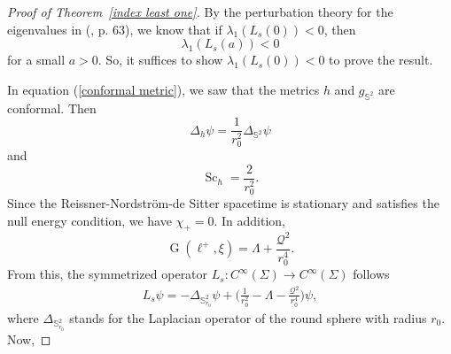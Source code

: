 \documentclass[a4paper, 11pt, reqno]{amsart}
\newcommand{\Ein}{\operatorname{G}}
\newcommand{\s}{\operatorname{Sc}}
\begin{document}
   

\begin{proof}[Proof of Theorem~\ref{index least one}]

By the perturbation theory for the eigenvalues in (\cite{K}, p. 63), we know that if $\lambda_1(L_s(0))<0$, then
$$\lambda_1(L_s(a))<0$$
for a small $a>0$. So, it suffices to show $\lambda_1(L_s(0))<0$ to prove the result. 

In equation (\ref{conformal metric}), we saw that the metrics $h$ and $g_{\mathbb{S}^2}$ are conformal. Then
\begin{equation*}
    \Delta_{h}\psi=\frac{1}{r_0^2}\Delta_{\mathbb{S}^2}\psi
\end{equation*}
and
\begin{equation*}
    \s_{h}=\frac{2}{r_0^2}.
\end{equation*}
Since the Reissner-Nordström-de Sitter spacetime is stationary and satisfies the null energy condition, we have $\chi_+=0$. In addition,
\begin{equation*}
     \Ein(\ell^{+},\xi)=\Lambda+\frac{\mathcal{Q}^2}{r_0^4}.
 \end{equation*}
 From this, the symmetrized operator $L_s: C^{\infty}(\Sigma)\longrightarrow C^{\infty}(\Sigma)$ follows 
\begin{eqnarray*}
  L_s\psi
  =-\Delta_{\mathbb{S}_{r_0}^2}\psi+\Big(\frac{1}{r_0^2}-\Lambda-\frac{\mathcal{Q}^2}{r_0^4}\Big)\psi,
\end{eqnarray*}
 where $\Delta_{\mathbb{S}^2_{r_0}}$ stands for the Laplacian operator of the round sphere with radius $r_0$. Now,


\end{proof}
\end{document}
